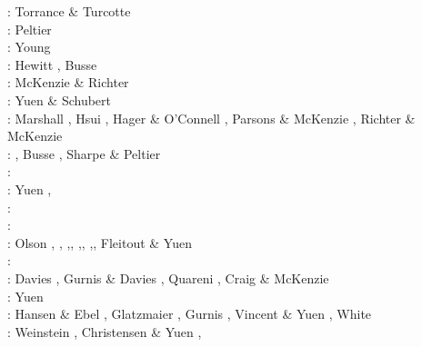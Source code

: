 \begin{scriptsize}
\nineteenseventyone: Torrance \& Turcotte \cite{totu71}\\
\nineteenseventytwo: Peltier \cite{pelt72}\\
\nineteenseventyfour: Young \cite{youn74}\\
\nineteenseventyfive: Hewitt \etal \cite{hemw75}, Busse \cite{buss75}\\
\nineteenseventysix: McKenzie \& Richter \cite{mcri76}\\
\nineteenseventyseven: Yuen \& Schubert \cite{yusc77} \\
\nineteenseventyeight: Marshall \etal \cite{mahz78}, Hsui \cite{hsui78}, Hager \& O'Connell \cite{haoc78},
                       Parsons \& McKenzie \cite{pamc78}, Richter \& McKenzie \cite{rimc78}\\
\nineteenseventynine: \cite{ludt79}, Busse \cite{buss79}, Sharpe \& Peltier \cite{shpe79}\\
\nineteeneighty: \cite{olco80}\cite{jamc80}\cite{scsc80}\cite{zess80}\\
\nineteeneightyone: Yuen \etal \cite{yups81}, \cite{buss81}\cite{jasc81}\cite{haoc81}\cite{cotu81}\\
\nineteeneightytwo: \cite{jape82}\cite{homc82}\cite{buri82}\\
\nineteeneightythree: \cite{hous83}\cite{hous83b}
                      \cite{chri83}\cite{mcke83}
                      \cite{chri83b}\cite{zesd83}\\
\nineteeneightyfour: Olson \etal \cite{olyb84}, \cite{jarv84},
                     \cite{haeb84},\cite{harp84},
                     \cite{davi84},\cite{boas84},
                     \cite{chri84},\cite{moca84},
                     Fleitout \& Yuen \cite{flyu84,flyu84b}\\
\nineteeneightyfive: \cite{jarv85}\cite{baum85}\cite{chri85}\cite{csra85}\cite{scan85}\\
\nineteeneightysix: Davies \cite{davi86}, Gurnis \& Davies \cite{guda86},
                    Quareni \etal \cite{quys86}, Craig \& McKenzie \cite{crmc86}\\
\nineteeneightyseven: Yuen \etal{}\cite{yuqh87}\\
\nineteeneightyeight: Hansen \& Ebel \cite{haeb88}, Glatzmaier \cite{glat88}, 
                      Gurnis \cite{gurn88}, Vincent \& Yuen \cite{viyu88},
                      White \cite{whit88}  \\ 
\nineteeneightynine: Weinstein \etal \cite{weoy89}, Christensen \& Yuen \cite{chyu89},

\end{scriptsize}
